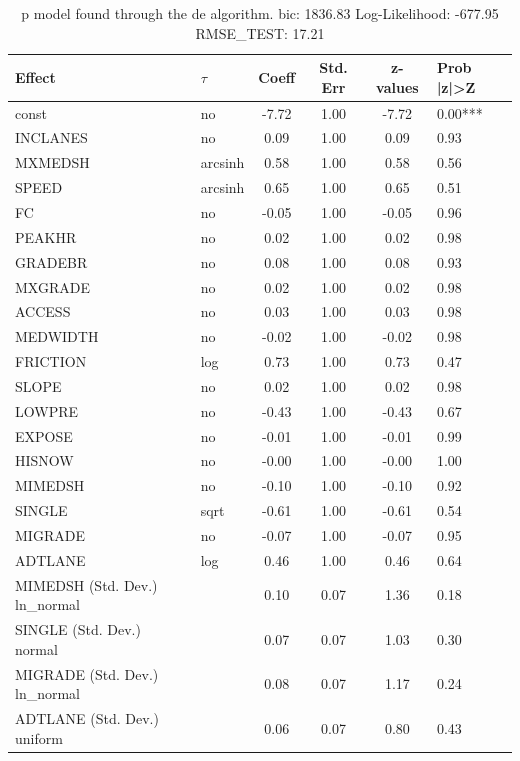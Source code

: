 \begin{table}
	\caption{p model found through the de algorithm. bic: 1836.83 Log-Likelihood: -677.95 RMSE_TEST: 17.21}
	\begin{center}
		\begin{tabular}{|l|l|c|c|c|l|}
			\hline
			Effect & $\tau$ & Coeff & Std. Err & z-values & Prob |z|>Z \\
			\hline
			const & no & -7.72 & 1.00 & -7.72 & 0.00*** \\
			\hline
			INCLANES & no & 0.09 & 1.00 & 0.09 & 0.93 \\
			\hline
			MXMEDSH & arcsinh & 0.58 & 1.00 & 0.58 & 0.56 \\
			\hline
			SPEED & arcsinh & 0.65 & 1.00 & 0.65 & 0.51 \\
			\hline
			FC & no & -0.05 & 1.00 & -0.05 & 0.96 \\
			\hline
			PEAKHR & no & 0.02 & 1.00 & 0.02 & 0.98 \\
			\hline
			GRADEBR & no & 0.08 & 1.00 & 0.08 & 0.93 \\
			\hline
			MXGRADE & no & 0.02 & 1.00 & 0.02 & 0.98 \\
			\hline
			ACCESS & no & 0.03 & 1.00 & 0.03 & 0.98 \\
			\hline
			MEDWIDTH & no & -0.02 & 1.00 & -0.02 & 0.98 \\
			\hline
			FRICTION & log & 0.73 & 1.00 & 0.73 & 0.47 \\
			\hline
			SLOPE & no & 0.02 & 1.00 & 0.02 & 0.98 \\
			\hline
			LOWPRE & no & -0.43 & 1.00 & -0.43 & 0.67 \\
			\hline
			EXPOSE & no & -0.01 & 1.00 & -0.01 & 0.99 \\
			\hline
			HISNOW & no & -0.00 & 1.00 & -0.00 & 1.00 \\
			\hline
			MIMEDSH & no & -0.10 & 1.00 & -0.10 & 0.92 \\
			\hline
			SINGLE & sqrt & -0.61 & 1.00 & -0.61 & 0.54 \\
			\hline
			MIGRADE & no & -0.07 & 1.00 & -0.07 & 0.95 \\
			\hline
			ADTLANE & log & 0.46 & 1.00 & 0.46 & 0.64 \\
			\hline
			MIMEDSH (Std. Dev.) ln_normal &  & 0.10 & 0.07 & 1.36 & 0.18 \\
			\hline
			SINGLE (Std. Dev.) normal &  & 0.07 & 0.07 & 1.03 & 0.30 \\
			\hline
			MIGRADE (Std. Dev.) ln_normal &  & 0.08 & 0.07 & 1.17 & 0.24 \\
			\hline
			ADTLANE (Std. Dev.) uniform &  & 0.06 & 0.07 & 0.80 & 0.43 \\
			\hline
		\end{tabular}
	\end{center}
\end{table}